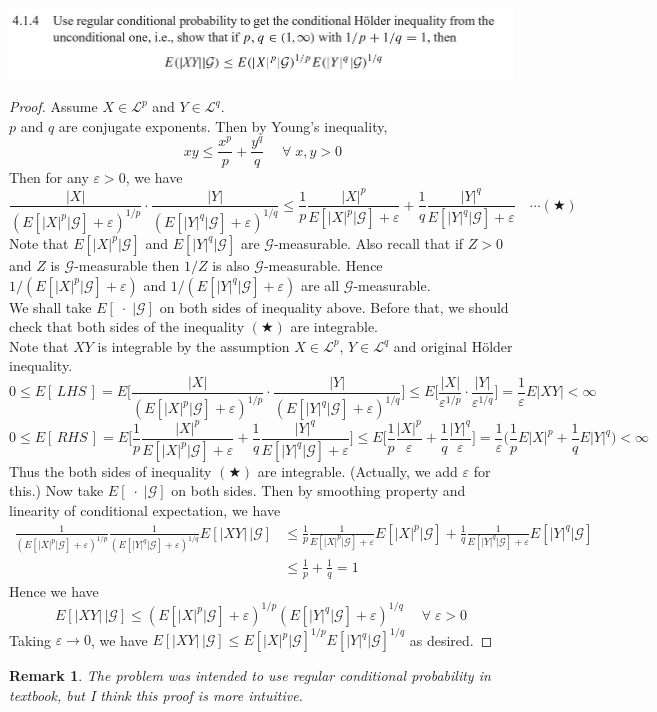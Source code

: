 \documentclass[12pt, A4]{article}
\newtheorem*{remark}{Remark}
\newcommand{\G}{\mathcal{G}}
\newcommand{\LL}{\mathcal{L}}
\begin{document}
\includegraphics{Exer4.1.4.JPG}
\begin{proof}
	Assume $X\in \LL^p$ and $Y\in \LL^q$.\\ $p$ and $q$ are conjugate exponents. Then by Young's inequality, $$\;xy\leq \frac{x^p}{p}+\frac{y^q}{q}\quad \; \forall\; x,y>0$$ 
	Then for any $\varepsilon>0$, we have 
	$$
	\frac{|X|}{(E[|X|^p|\G]+\varepsilon)^{1/p}}\cdot \frac{|Y|}{(E[|Y|^q |\G]+\varepsilon)^{1/q}}\leq \frac{1}{p}\frac{|X|^p}{E[|X|^p|\G]+\varepsilon}+\frac{1}{q}\frac{|Y|^q}{E[|Y|^q |\G]+\varepsilon} \quad \cdots (\bigstar)
	$$
	Note that $E[|X|^p|\G]$ and $E[|Y|^q|\G]$ are $\G$-measurable. Also recall that if $Z>0$ and $Z$ is $\G$-measurable then $1/Z$ is also $\G$-measurable. Hence $1/(E[|X|^p|\G]+\varepsilon)$ and $1/(E[|Y|^q|\G]+\varepsilon)$ are all $\G$-measurable. \\
	We shall take $E[\;\cdot\;|\G]$ on both sides of inequality above. Before that, we should check that both sides of the inequality $(\bigstar)$ are integrable.\\
	Note that $XY$ is integrable by the assumption $X\in \LL^p$, $Y\in \LL^q$ and original H\"{o}lder inequality.
	$$0\leq E[\,LHS\,]= E\Big[\frac{|X|}{(E[|X|^p|\G]+\varepsilon)^{1/p}}\cdot \frac{|Y|}{(E[|Y|^q |\G]+\varepsilon)^{1/q}}\Big]\leq E\Big[\frac{|X|}{\varepsilon^{1/p}}\cdot\frac{|Y|}{\varepsilon^{1/q}} \Big]=\frac{1}{\varepsilon}E|XY|<\infty$$
	$$0\leq E[\,RHS\,]=E\Big[\frac{1}{p}\frac{|X|^p}{E[|X|^p|\G]+\varepsilon}+\frac{1}{q}\frac{|Y|^q}{E[|Y|^q |\G]+\varepsilon}\Big]\leq E\Big[\frac{1}{p}\frac{|X|^p}{\varepsilon}+\frac{1}{q}\frac{|Y|^q}{\varepsilon} \Big]=\frac{1}{\varepsilon}\Big(\frac{1}{p}E|X|^p +\frac{1}{q}E|Y|^q\Big)<\infty $$
	Thus the both sides of inequality $(\bigstar)$ are integrable. (Actually, we add $\varepsilon$ for this.) Now take $E[\;\cdot\;|\G]$ on both sides. Then by smoothing property and linearity of conditional expectation, we have
	\begin{align*}
		\frac{1}{(E[|X|^p|\G]+\varepsilon)^{1/p}}\frac{1}{(E[|Y|^q |\G]+\varepsilon)^{1/q}}E[|XY|\, \big | \G] &\leq \frac{1}{p}\frac{1}{E[|X|^p|\G]+\varepsilon}E[|X|^p| \G]+\frac{1}{q}\frac{1}{E[|Y|^q |\G]+\varepsilon}E[|Y|^q|\G] \\ &\leq \frac{1}{p}+\frac{1}{q}=1
	\end{align*}
	Hence we have $$E[|XY|\, \big | \G]\leq (E[|X|^p|\G]+\varepsilon)^{1/p}(E[|Y|^q |\G]+\varepsilon)^{1/q}  \quad \; \forall\; \varepsilon>0$$
	Taking $\varepsilon \rightarrow 0$, we have $E[|XY|\, \big | \G]\leq E[|X|^p |\G]^{1/p}E[|Y|^q|\G]^{1/q}$ as desired.  
\end{proof}
\begin{remark}
	The problem was intended to use regular conditional probability in textbook, but I think this proof is more intuitive.
\end{remark}
\vspace{1cm}
\end{document}
